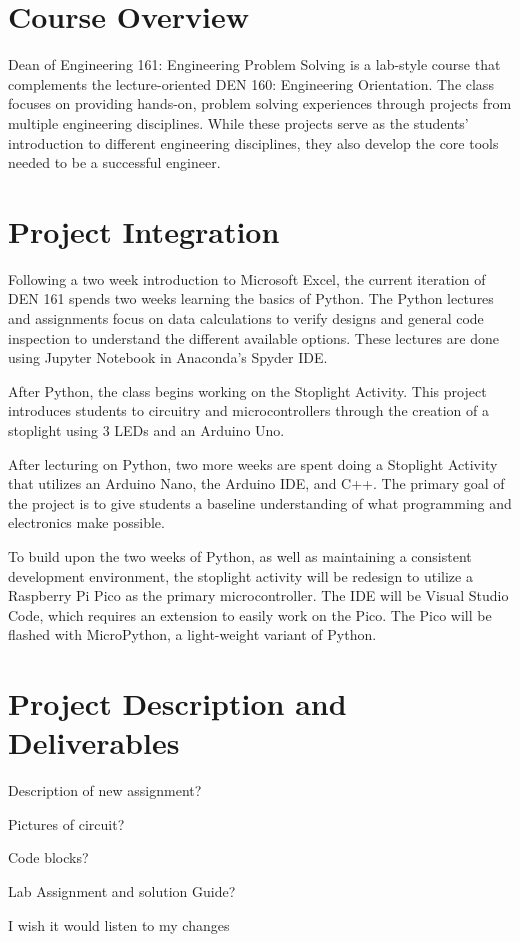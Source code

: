 \section{Course Overview}
Dean of Engineering 161: Engineering Problem Solving is a lab-style
course that complements the lecture-oriented DEN 160: Engineering
Orientation. The class focuses on providing hands-on, problem
solving experiences through projects from multiple engineering 
disciplines. While these projects serve as the students' introduction
to different engineering disciplines, they also develop the core 
tools needed to be a successful engineer. 

\section{Project Integration}
Following a two week introduction to Microsoft Excel, the current 
iteration of DEN 161 spends two weeks learning the basics of Python. 
The Python lectures and assignments focus on data calculations to 
verify designs and general code inspection to understand the 
different available options. These lectures are done using Jupyter
Notebook in Anaconda's Spyder IDE. 

After Python, the class begins working on the Stoplight Activity.
This project introduces students to circuitry and microcontrollers 
through the creation of a stoplight using 3 LEDs and an Arduino Uno.


After lecturing on Python,
two more weeks are spent doing a Stoplight Activity that 
utilizes an Arduino Nano, the Arduino IDE, and C++. The primary goal 
of the project is to give students a baseline understanding of what 
programming and electronics make possible.



To build upon the two weeks of Python, as well as maintaining a 
consistent development environment, the stoplight activity will be 
redesign to utilize a Raspberry Pi Pico as the primary microcontroller. The IDE will be Visual Studio Code, which requires an extension to easily work on the Pico. The Pico will be flashed with MicroPython, a light-weight variant of Python.

\section{Project Description and Deliverables}
Description of new assignment?

Pictures of circuit?

Code blocks?

Lab Assignment and solution Guide?

I wish it would listen to my changes